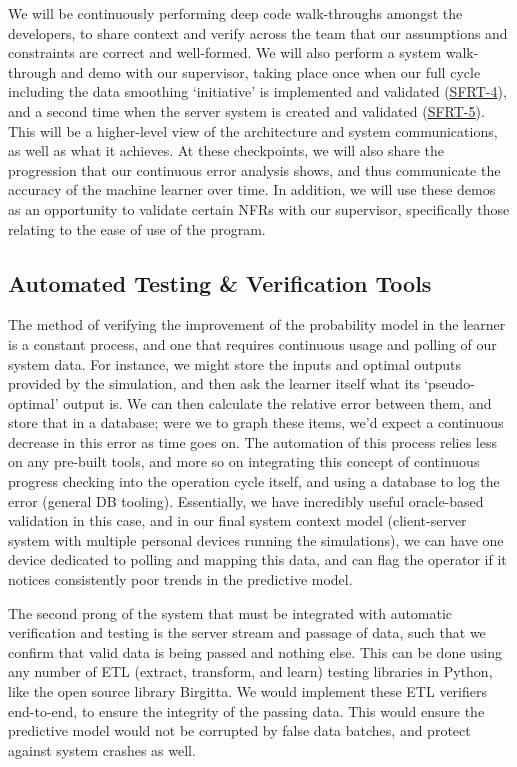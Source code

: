 \documentclass[12pt, titlepage]{article}
\begin{document}
We will be continuously performing deep code walk-throughs amongst the developers, to share context and verify across the team that our assumptions and constraints are correct and well-formed. We will also perform a system walk-through and demo with our supervisor, taking place once when our full cycle including the data smoothing ‘initiative’ is implemented and validated (\hyperlink{SFRT-4Anchor}{SFRT-4}), and a second time when the server system is created and validated (\hyperlink{SFRT-5Anchor}{SFRT-5}). This will be a higher-level view of the architecture and system communications, as well as what it achieves. At these checkpoints, we will also share the progression that our continuous error analysis shows, and thus communicate the accuracy of the machine learner over time. In addition, we will use these demos as an opportunity to validate certain NFRs with our supervisor, specifically those relating to the ease of use of the program.

\subsection{Automated Testing \& Verification Tools}
The method of verifying the improvement of the probability model in the learner is a constant process, and one that requires continuous usage and polling of our system data. For instance, we might store the inputs and optimal outputs provided by the simulation, and then ask the learner itself what its ‘pseudo-optimal’ output is. We can then calculate the relative error between them, and store that in a database; were we to graph these items, we’d expect a continuous decrease in this error as time goes on. The automation of this process relies less on any pre-built tools, and more so on integrating this concept of continuous progress checking into the operation cycle itself, and using a database to log the error (general DB tooling). Essentially, we have incredibly useful oracle-based validation in this case, and in our final system context model (client-server system with multiple personal devices running the simulations), we can have one device dedicated to polling and mapping this data, and can flag the operator if it notices consistently poor trends in the predictive model.

The second prong of the system that must be integrated with automatic verification and testing is the server stream and passage of data, such that we confirm that valid data is being passed and nothing else. This can be done using any number of ETL (extract, transform, and learn) testing libraries in Python, like the open source library Birgitta. We would implement these ETL verifiers end-to-end, to ensure the integrity of the passing data. This would ensure the predictive model would not be corrupted by false data batches, and protect against system crashes as well. 
\end{document}
